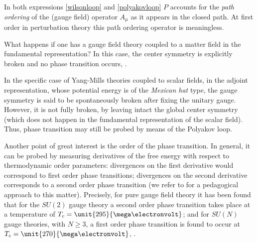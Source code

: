 In both expressions \eqref{wilsonloop} and \eqref{polyakovloop} $P$ accounts for the \emph{path
ordering} of the (gauge field) operator $A_{\mu}$ as it appears in the closed path. At first
order in perturbation theory this path ordering operator is meaningless.

What happens if one has a gauge field theory coupled to a matter field in the fundamental
representation? In this case, the center symmetry is explicitly broken and no phase transition
occurs, \cite{Fradkin:1978dv,Greensite:2011zz}.

In the specific case of Yang-Mills theories coupled to scalar fields, in the adjoint
representation, whose potential energy is of the \emph{Mexican hat} type, the gauge symmetry is
said to be spontaneously broken after fixing the unitary gauge. However, it is not fully
broken, by leaving intact the global center symmetry (which does not happen in the fundamental
representation of the scalar field). Thus, phase transition may still be probed by means of the
Polyakov loop.


Another point of great interest is the order of the phase transition. In general, it can be
probed by measuring derivatives of the free energy with respect to thermodynamic order
parameters: divergences on the first derivative
would correspond to first order phase transitions; divergences on the second derivative
corresponds to a second order phase transition (we refer to \cite{LeBellac:1991cq} for a
pedagogical approach to this matter). Precisely, for pure gauge field theory it has been found
that for the $SU(2)$ gauge theory a second order phase transition takes place at a temperature
of $T_{c} = \unit{295}{\mega\electronvolt}$; and for $SU(N)$ gauge theories, with $N \ge 3$, a
first order phase transition is found to occur at $T_{c} = \unit{270}{\mega\electronvolt}$,
\cite{Fukushima:2002bk,Fukushima:thesis,Fukushima:2010bq,Bazavov:2009zn,Fukushima:2003fw,Banks:1979yr}.






